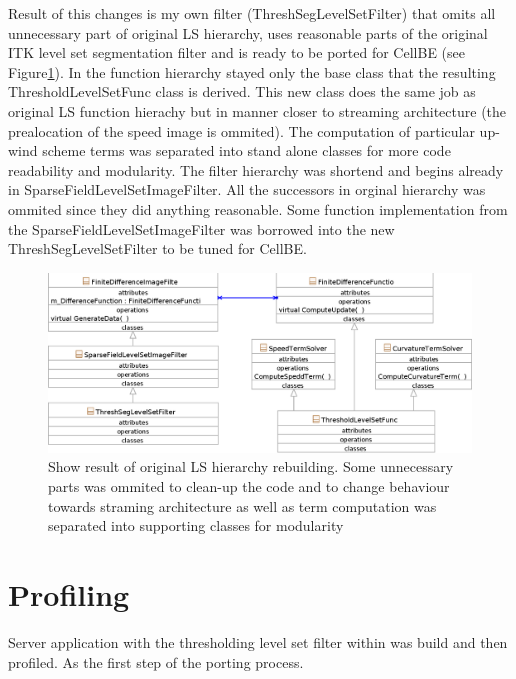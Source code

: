 Result of this changes is my own filter (ThreshSegLevelSetFilter) that omits all unnecessary part of original LS hierarchy, uses reasonable parts of the original ITK level set segmentation filter and is ready to be ported for CellBE (see Figure\ref{fg:resultingFilter}). In the function hierarchy stayed only the base class that the resulting ThresholdLevelSetFunc class is derived. This new class does the same job as original LS function hierachy but in manner closer to streaming architecture (the prealocation of the speed image is ommited). The computation of particular up-wind scheme terms was separated into stand alone classes for more code readability and modularity. The filter hierarchy was shortend and begins already in SparseFieldLevelSetImageFilter. All the successors in orginal hierarchy was ommited since they did anything reasonable. Some function implementation from the SparseFieldLevelSetImageFilter was borrowed into the new ThreshSegLevelSetFilter to be tuned for CellBE.

\begin{figure}
    \centering
    \includegraphics[width=15cm]{data/resultingFilter.eps}
    \caption[Resulting level set filter ready to be ported to CellBE]{Show result of original LS hierarchy rebuilding. Some unnecessary parts was ommited to clean-up the code and to change behaviour towards straming architecture as well as term computation was separated into supporting classes for modularity}
    \label{fg:resultingFilter}
\end{figure}

\section{Profiling}

Server application with the thresholding level set filter within was build and then profiled. As the first step of the porting process.

